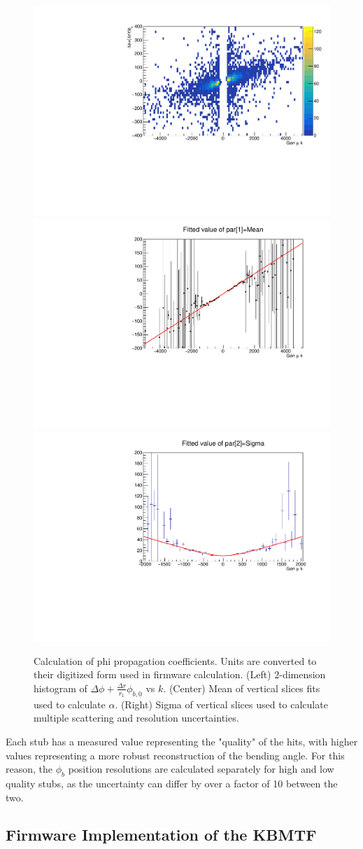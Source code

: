 \begin{figure}[htb!]
	\centering
	\includegraphics[width=0.32\linewidth]{figs/04_muons/phiprop_2d.pdf}
	\includegraphics[width=0.32\linewidth]{figs/04_muons/phiprop_mean.pdf}
	\includegraphics[width=0.32\linewidth]{figs/04_muons/phiprop_sigma.pdf}
	\caption[Calculation of phi propagation coefficients. Units are converted to their digitized form used in firmware calculation. (Left) 2-dimension histogram of $\Delta\phi+\frac{\Delta r}{r_1}\phi_{b,0}$ vs $k$. (Center) Mean of vertical slices fits used to calculate $\alpha$. (Right) Sigma of vertical slices used to calculate multiple scattering and resolution uncertainties.]
	{Calculation of phi propagation coefficients. Units are converted to their digitized form used in firmware calculation. (Left) 2-dimension histogram of $\Delta\phi+\frac{\Delta r}{r_1}\phi_{b,0}$ vs $k$. (Center) Mean of vertical slices fits used to calculate $\alpha$. (Right) Sigma of vertical slices used to calculate multiple scattering and resolution uncertainties.}
	\label{fig:phi_prop}
\end{figure}

Each stub has a measured value representing the "quality" of the hits, with higher values representing a more robust reconstruction of the bending angle. For this reason, the $\phi_b$ position resolutions are calculated separately for high and low quality stubs, as the uncertainty can differ by over a factor of 10 between the two. 

\subsection{Firmware Implementation of the KBMTF} \label{sec:fw}

